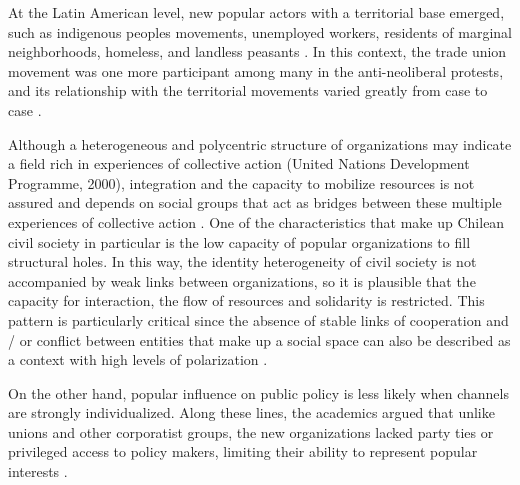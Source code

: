 At the Latin American level, new popular actors with a territorial base emerged, such as indigenous peoples movements, unemployed workers, residents of marginal neighborhoods, homeless, and landless peasants \parencite{merklen_pobres_2010, rossi_second_2015, seoane_nuevas_2006, svampa_movimientos_2010}. In this context, the trade union movement was one more participant among many in the anti-neoliberal protests, and its relationship with the territorial movements varied greatly from case to case \parencite{silva_challenging_2009}. 
\bigskip

Although a heterogeneous and polycentric structure of organizations may indicate a field rich in experiences of collective action (United Nations Development Programme, 2000), integration and the capacity to mobilize resources is not assured and depends on social groups that act as bridges between these multiple experiences of collective action \parencite{baldassarri_integrative_2007, granovetter_strength_1973}. One of the characteristics that make up Chilean civil society in particular is the low capacity of popular organizations to fill structural holes. In this way, the identity heterogeneity of civil society is not accompanied by weak links between organizations, so it is plausible that the capacity for interaction, the flow of resources and solidarity is restricted. This pattern is particularly critical since the absence of stable links of cooperation and / or conflict between entities that make up a social space can also be described as a context with high levels of polarization \parencite{aref_detecting_2020}.
\bigskip

On the other hand, popular influence on public policy is less likely when channels are strongly individualized. Along these lines, the academics argued that unlike unions and other corporatist groups, the new organizations lacked party ties or privileged access to policy makers, limiting their ability to represent popular interests \parencite{collier_reorganizing_2009, silva_reshaping_2018}.
\bigskip

